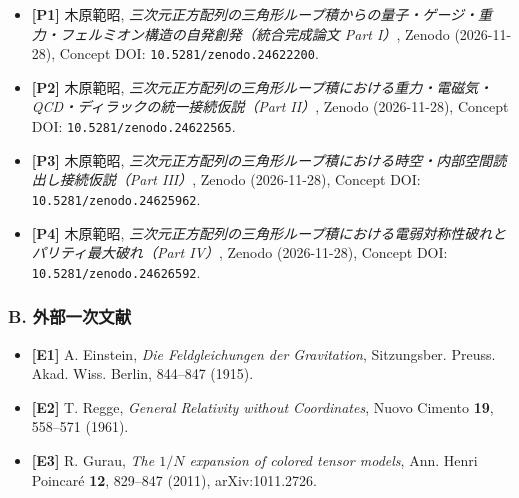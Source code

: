 \documentclass[
  a4paper,
]{ltjsarticle}
\providecommand{\tightlist}{%
  \setlength{\itemsep}{0pt}\setlength{\parskip}{0pt}}
\begin{document}
\begin{itemize}
\tightlist
\item
  \textbf{{[}P1{]}} 木原範昭,
  \emph{三次元正方配列の三角形ループ積からの量子・ゲージ・重力・フェルミオン構造の自発創発（統合完成論文
  Part I）}, Zenodo (2026-11-28), Concept DOI:
  \texttt{10.5281/zenodo.24622200}.
\item
  \textbf{{[}P2{]}} 木原範昭,
  \emph{三次元正方配列の三角形ループ積における重力・電磁気・QCD・ディラックの統一接続仮説（Part
  II）}, Zenodo (2026-11-28), Concept DOI:
  \texttt{10.5281/zenodo.24622565}.
\item
  \textbf{{[}P3{]}} 木原範昭,
  \emph{三次元正方配列の三角形ループ積における時空・内部空間読出し接続仮説（Part
  III）}, Zenodo (2026-11-28), Concept DOI:
  \texttt{10.5281/zenodo.24625962}.
\item
  \textbf{{[}P4{]}} 木原範昭,
  \emph{三次元正方配列の三角形ループ積における電弱対称性破れとパリティ最大破れ（Part
  IV）}, Zenodo (2026-11-28), Concept DOI:
  \texttt{10.5281/zenodo.24626592}.
\end{itemize}

\subsubsection{B.
外部一次文献}\label{b.-ux5916ux90e8ux4e00ux6b21ux6587ux732e}

\begin{itemize}
\tightlist
\item
  \textbf{{[}E1{]}} A. Einstein, \emph{Die Feldgleichungen der
  Gravitation}, Sitzungsber. Preuss. Akad. Wiss. Berlin, 844--847
  (1915).
\item
  \textbf{{[}E2{]}} T. Regge, \emph{General Relativity without
  Coordinates}, Nuovo Cimento \textbf{19}, 558--571 (1961).
\item
  \textbf{{[}E3{]}} R. Gurau, \emph{The \(1/N\) expansion of colored
  tensor models}, Ann. Henri Poincaré \textbf{12}, 829--847 (2011),
  arXiv:1011.2726.
\end{itemize}
\end{document}
